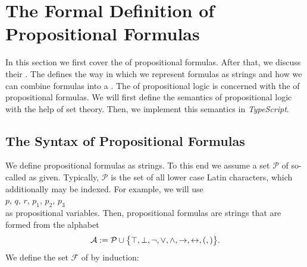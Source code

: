 \section{The Formal Definition of Propositional Formulas}
In this section we first cover the  of propositional formulas.  After that, we discuss their
. The   defines the way in which we represent formulas as strings
and how we can combine formulas into a .  The   of propositional
logic is concerned with the   of propositional formulas.
We will first define the semantics of propositional logic with the help of set theory.
Then, we implement this semantics in \textsl{TypeScript}.

\subsection{The Syntax of Propositional Formulas}
We define propositional formulas as strings.  To this end we assume a set  $\mathcal{P}$  
of so-called  as given. 
Typically, $\mathcal{P}$ is the set of all lower case Latin characters, which additionally may be indexed.
For example, we will use 
\\[0.2cm]
\hspace*{1.3cm}
$p$, $q$, $r$, $p_1$, $p_2$, $p_3$
\\[0.2cm]
as propositional variables.  Then, propositional formulas are strings that are formed from the alphabet
$$ 
  \mathcal{A} := \mathcal{P} \cup \bigl\{ \top, \bot, \neg, \vee, \wedge,
   \rightarrow, \leftrightarrow, (, ) \bigr\}.
$$
We define the set $\mathcal{F}$ of 
by induction:
